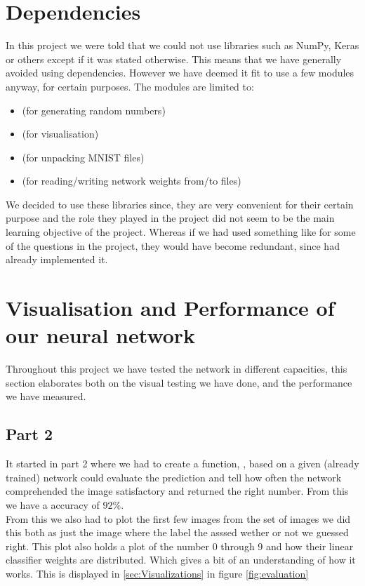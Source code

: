 \documentclass[a4paper,oneside,article,english]{memoir}
\begin{document}
\section{Dependencies}  
\label{sec:dependencies}
In this project we were told that we could not use libraries such as NumPy,
Keras or others except if it was stated otherwise. This means that we have
generally avoided using dependencies. However we have deemed it fit to use a few
modules anyway, for certain purposes. The modules are limited to: 
\begin{itemize}
  \item
    \href{https://docs.python.org/3/library/random.html}{\underline{}}
    (for generating random numbers)
  \item \href{https://matplotlib.org}{\underline{}} (for
    visualisation)
  \item
    \href{https://docs.python.org/3/library/gzip.html}{\underline{}}
    (for unpacking MNIST  files)
  \item
    \href{https://docs.python.org/3/library/json.html}{\underline{}}
    (for reading/writing network weights from/to files)
\end{itemize}
We decided to use these libraries since, they are very convenient for their certain purpose and the role they played in the project did not seem to be the main learning objective of the project. Whereas if we had used something like
\href{https://numpy.org}{\underline{}} for some
of the questions in the project, they would have become redundant, since
 had already implemented it.


\section{Visualisation and Performance of our neural network}  
\label{sec:visualisation and performance}
Throughout this project we have tested the network in different capacities, this
section elaborates both on the visual testing we have done, and the performance
we have measured.
\subsection{Part 2}
It started in part 2 where we had to create a function, , based on a given (already trained) network could evaluate the prediction and tell how often the network comprehended the image satisfactory and returned the right number. From this we have a accuracy of $92\%$.\\
From this we also had to plot the first few images from the set of images we did this both as just the image where the label the asssed wether or not we guessed right. This plot also holds a plot of the number 0 through 9 and how their linear classifier weights are distributed. Which gives a bit of an understanding of how it works. This is displayed in \ref{sec:Visualizations} in figure \ref{fig:evaluation}
\end{document}
